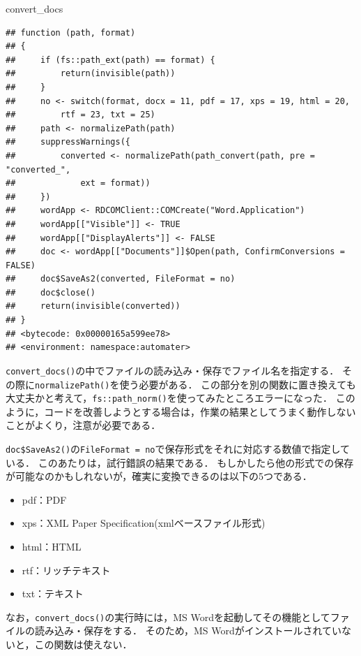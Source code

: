 \documentclass[
]{article}
\newenvironment{Shaded}{\begin{snugshade}}{\end{snugshade}}
\newcommand{\NormalTok}[1]{#1}
\providecommand{\tightlist}{%
  \setlength{\itemsep}{0pt}\setlength{\parskip}{0pt}}
\begin{document}
\begin{Shaded}
\begin{Highlighting}[]
\NormalTok{convert\_docs}
\end{Highlighting}
\end{Shaded}

\begin{verbatim}
## function (path, format) 
## {
##     if (fs::path_ext(path) == format) {
##         return(invisible(path))
##     }
##     no <- switch(format, docx = 11, pdf = 17, xps = 19, html = 20, 
##         rtf = 23, txt = 25)
##     path <- normalizePath(path)
##     suppressWarnings({
##         converted <- normalizePath(path_convert(path, pre = "converted_", 
##             ext = format))
##     })
##     wordApp <- RDCOMClient::COMCreate("Word.Application")
##     wordApp[["Visible"]] <- TRUE
##     wordApp[["DisplayAlerts"]] <- FALSE
##     doc <- wordApp[["Documents"]]$Open(path, ConfirmConversions = FALSE)
##     doc$SaveAs2(converted, FileFormat = no)
##     doc$close()
##     return(invisible(converted))
## }
## <bytecode: 0x00000165a599ee78>
## <environment: namespace:automater>
\end{verbatim}

\texttt{convert\_docs()}の中でファイルの読み込み・保存でファイル名を指定する．
その際に\texttt{normalizePath()}を使う必要がある．
この部分を別の関数に置き換えても大丈夫かと考えて，\texttt{fs::path\_norm()}を使ってみたところエラーになった．
このように，コードを改善しようとする場合は，作業の結果としてうまく動作しないことがよくり，注意が必要である．

\texttt{doc\$SaveAs2()}の\texttt{FileFormat\ =\ no}で保存形式をそれに対応する数値で指定している．
このあたりは，試行錯誤の結果である．
もしかしたら他の形式での保存が可能なのかもしれないが，確実に変換できるのは以下の5つである．

\begin{itemize}
\tightlist
\item
  pdf：PDF
\item
  xps：XML Paper Specification(xmlベースファイル形式)\\
\item
  html：HTML\\
\item
  rtf：リッチテキスト\\
\item
  txt：テキスト
\end{itemize}

なお，\texttt{convert\_docs()}の実行時には，MS Wordを起動してその機能としてファイルの読み込み・保存をする．
そのため，MS Wordがインストールされていないと，この関数は使えない．
\end{document}
